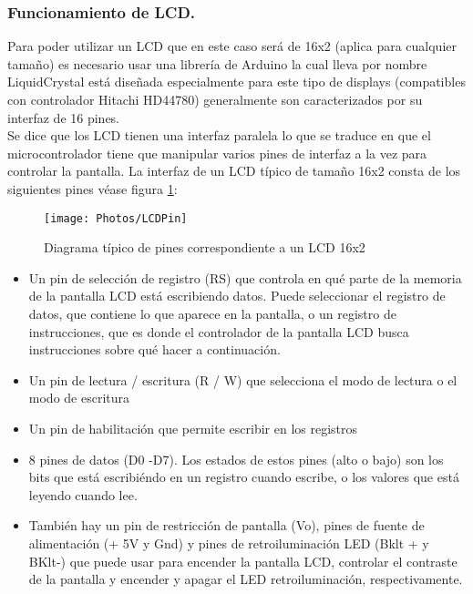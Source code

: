 \documentclass[11pt,letter
								]
								{article}
\begin{document}
\subsubsection{Funcionamiento de LCD.}
Para poder utilizar un LCD que en este caso será de 16x2 (aplica para cualquier tamaño) es necesario  usar una librería de Arduino la cual lleva por nombre  LiquidCrystal   está diseñada especialmente para este tipo de displays (compatibles con controlador  Hitachi HD44780) generalmente son caracterizados por su interfaz de 16 pines.\\

Se dice que los LCD tienen una interfaz paralela lo que se traduce en  que el microcontrolador tiene que manipular varios pines de interfaz a la vez para controlar la pantalla. La interfaz de un LCD típico de tamaño 16x2  consta de los siguientes pines véase figura \ref{8}:

\begin{figure}[H]
\centering
\texttt{[image: Photos/LCDPin]}
\caption{Diagrama típico de pines correspondiente a un  LCD 16x2 \cite{ATuto}  } 
\label{8}
\end{figure}


\begin{itemize}
\item Un pin de selección de registro (RS) que controla en qué parte de la memoria de la pantalla LCD está escribiendo datos. Puede seleccionar el registro de datos, que contiene lo que aparece en la pantalla, o un registro de instrucciones, que es donde el controlador de la pantalla LCD busca instrucciones sobre qué hacer a continuación.\\

\item Un pin de lectura / escritura (R / W) que selecciona el modo de lectura o el modo de escritura\\

\item Un pin de habilitación que permite escribir en los registros\\

\item 8 pines de datos (D0 -D7). Los estados de estos pines (alto o bajo) son los bits que está escribiéndo en un registro cuando escribe, o los valores que está leyendo cuando lee.\\

\item También hay un pin de restricción de pantalla (Vo), pines de fuente de alimentación (+ 5V y Gnd) y pines de retroiluminación LED (Bklt + y BKlt-) que puede usar para encender la pantalla LCD, controlar el contraste de la pantalla y encender y apagar el LED retroiluminación, respectivamente.\cite{LCDinfo}\\

\end{itemize}
\end{document}
